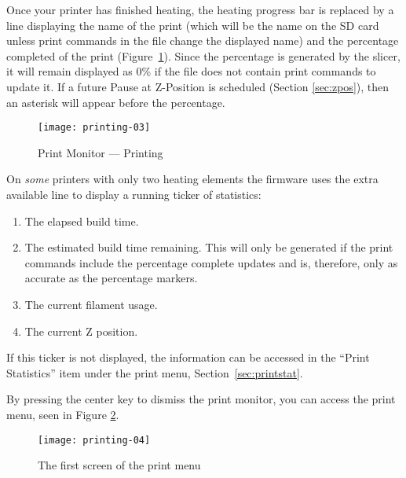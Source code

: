 Once your printer has finished heating, the heating progress bar is replaced by a line displaying the name of the print (which will be the name on the SD card unless print commands in the file change the displayed name) and the percentage completed of the print (Figure~\ref{fig:print}).  Since the percentage is generated by the \gls{slicer}, it will remain displayed as 0\% if the file does not contain print commands to update it.  If a future Pause at Z-Position is scheduled (Section \ref{sec:zpos}), then an asterisk will appear before the percentage.

\begin{figure}[!htbp]
  \centering
    \texttt{[image: printing-03]}
    \caption{Print Monitor --- Printing}
  \label{fig:print}
\end{figure}

On \emph{some} printers with only two heating elements the firmware uses the extra available line to display a running ticker of statistics:
\begin{enumerate}
\item The elapsed build time.
\item The estimated build time remaining.  This will only be generated if the print commands include the percentage complete updates and is, therefore, only as accurate as the percentage markers.
\item The current filament usage.
\item The current Z position.
\end{enumerate}
If this ticker is not displayed, the information can be accessed in the ``Print Statistics'' item under the print menu, Section~\ref{sec:printstat}.

By pressing the center key to dismiss the print monitor, you can access the print menu, seen in Figure \ref{fig:printeth-menueth}.

\begin{figure}[!htbp]
  \centering
    \texttt{[image: printing-04]}
    \caption{The first screen of the print menu}
  \label{fig:printeth-menueth}
\end{figure}

